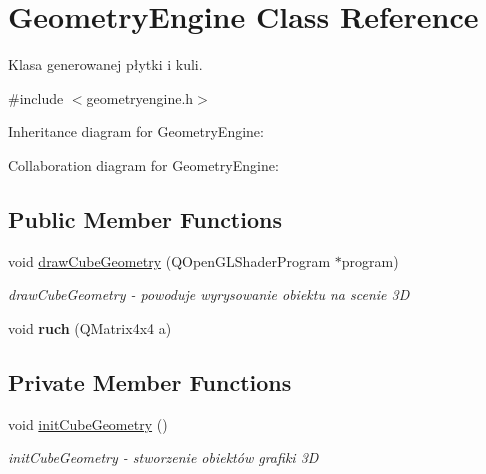 \hypertarget{classGeometryEngine}{}\section{Geometry\+Engine Class Reference}
\label{classGeometryEngine}


Klasa generowanej płytki i kuli.  




{\ttfamily \#include $<$geometryengine.\+h$>$}



Inheritance diagram for Geometry\+Engine\+:


Collaboration diagram for Geometry\+Engine\+:
\subsection*{Public Member Functions}
\begin{DoxyCompactItemize}
\item 
void \hyperlink{classGeometryEngine_a9668fa4c753c20e6a7aae1244213296f}{draw\+Cube\+Geometry} (Q\+Open\+G\+L\+Shader\+Program $\ast$program)
\begin{DoxyCompactList}\small\item\em draw\+Cube\+Geometry -\/ powoduje wyrysowanie obiektu na scenie 3D \end{DoxyCompactList}\item 
\mbox{\label{classGeometryEngine_a8a04669549b6d23f6826d5175d5c555a}} 
void {\bfseries ruch} (Q\+Matrix4x4 a)
\end{DoxyCompactItemize}
\subsection*{Private Member Functions}
\begin{DoxyCompactItemize}
\item 
\mbox{\label{classGeometryEngine_ae96763d291025a22af677aab09cc6878}} 
void \hyperlink{classGeometryEngine_ae96763d291025a22af677aab09cc6878}{init\+Cube\+Geometry} ()
\begin{DoxyCompactList}\small\item\em init\+Cube\+Geometry -\/ stworzenie obiektów grafiki 3D \end{DoxyCompactList}\end{DoxyCompactItemize}
